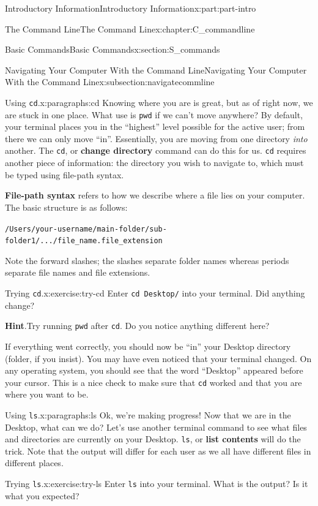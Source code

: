 \documentclass[oneside,10pt,]{book}
\newcommand{\blocktitlefont}{\relax}
\newcommand{\mono}[1]{\texttt{#1}}
\newcommand{\terminology}[1]{\textbf{#1}}
\begin{document}
\begin{partptx}{Introductory Information}{}{Introductory Information}{}{}{x:part:part-intro}
\begin{chapterptx}{The Command Line}{}{The Command Line}{}{}{x:chapter:C_commandline}
\begin{sectionptx}{Basic Commands}{}{Basic Commands}{}{}{x:section:S_commands}
\begin{subsectionptx}{Navigating Your Computer With the Command Line}{}{Navigating Your Computer With the Command Line}{}{}{x:subsection:navigatecommline}
\begin{paragraphs}{Using \mono{cd}.}{x:paragraphs:cd}
Knowing where you are is great, but as of right now, we are stuck in one place. What use is \mono{pwd} if we can't move anywhere? By default, your terminal places you in the ``highest'' level possible for the active user; from there we can only move ``in''. Essentially, you are moving from one directory \emph{into} another. The \mono{cd}, or \terminology{change directory} command can do this for us. \mono{cd} requires another piece of information: the directory you wish to navigate to, which must be typed using file-path syntax.%
\par
\terminology{File-path syntax} refers to how we describe where a file lies on your computer. The basic structure is as follows:%
\par
\mono{/Users/your-username/main-folder/sub-folder1/.../file\_name.file\_extension}%
\par
Note the forward slashes; the slashes separate folder names whereas periods separate file names and file extensions.%
\begin{inlineexercise}{Trying \mono{cd}.}{x:exercise:try-cd}%
Enter \mono{cd Desktop/} into your terminal. Did anything change?%
\par\smallskip%
\noindent\textbf{\blocktitlefont Hint}.\hypertarget{g:hint:idm480732872}{}\quad{}Try running \mono{pwd} after \mono{cd}. Do you notice anything different here?%
\end{inlineexercise}%
If everything went correctly, you should now be ``in'' your Desktop directory (folder, if you insist). You may have even noticed that your terminal changed. On any operating system, you should see that the word ``Desktop'' appeared before your cursor. This is a nice check to make sure that \mono{cd} worked and that you are where you want to be.%
\end{paragraphs}%
\begin{paragraphs}{Using \mono{ls}.}{x:paragraphs:ls}%
\index{command line!\mono{ls}}%
\index{\mono{ls}}%
%
Ok, we're making progress! Now that we are in the Desktop, what can we do? Let's use another terminal command to see what files and directories are currently on your Desktop. \mono{ls}, or \terminology{list contents} will do the trick. Note that the output will differ for each user as we all have different files in different places.%
\begin{inlineexercise}{Trying \mono{ls}.}{x:exercise:try-ls}%
Enter \mono{ls} into your terminal. What is the output? Is it what you expected?%
\end{inlineexercise}%

\end{paragraphs}
\end{subsectionptx}
\end{sectionptx}
\end{chapterptx}
\end{partptx}
\end{document}
